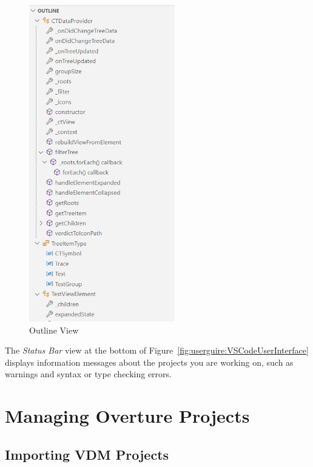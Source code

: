 \documentclass{overturerepchap}
\begin{document}
\begin{figure}[!htb]
\begin{center}
  \includegraphics[width=2.5in]{snapshots/Outline view.PNG}
  \caption[labelInTOC]{Outline View}
  \label{fig:OutlineView}
\end{center}
\end{figure}


The \emph{Status Bar} view at the bottom of
Figure~\ref{fig:userguire:VSCodeUserInterface} displays
information messages about the projects you are
working on, such as warnings and syntax or type checking errors.




\chapter{Managing Overture Projects}\label{sec:projects}

\section{Importing VDM Projects}\label{subsec:importproj}
\end{document}
